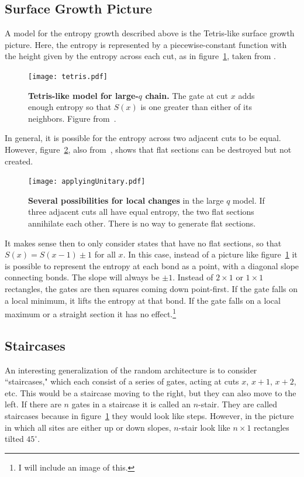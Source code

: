 \documentclass[11pt]{article}
\begin{document}
\subsection{Surface Growth Picture} \emph{} \label{sub:surfgrowth}

A model for the entropy growth described above is the Tetris-like surface growth picture. Here, the entropy is represented by a piecewise-constant function with the height given by the entropy across each cut, as in figure~\ref{fig:tetris}, taken from \cite{Nahum2017}. 
\begin{figure}
	\centering
	\texttt{[image: tetris.pdf]}
	\caption{\textbf{Tetris-like model for large-$q$ chain.} The gate at cut $x$ adds enough entropy so that $S(x)$ is one greater than either of its neighbors. Figure from~\cite{Nahum2017}.}
	\label{fig:tetris}
\end{figure}
In general, it is possible for the entropy across two adjacent cuts to be equal. However, figure~\ref{fig:applyingUnitary}, also from~\cite{Nahum2017}, shows that flat sections can be destroyed but not created. 
\begin{figure}
	\centering
	\texttt{[image: applyingUnitary.pdf]}
	\caption{\textbf{Several possibilities for local changes} in the large $q$ model. If three adjacent cuts all have equal entropy, the two flat sections annihilate each other. There is no way to generate flat sections.}
	\label{fig:applyingUnitary}
\end{figure}

It makes sense then to only consider states that have no flat sections, so that $S(x) = S(x-1)\pm1$ for all $x$. In this case, instead of a picture like figure~\ref{fig:tetris} it is possible to represent the entropy at each bond as a point, with a diagonal slope connecting bonds. The slope will always be $\pm1$. Instead of $2\times1$ or $1\times1$ rectangles, the gates are then squares coming down point-first. If the gate falls on a local minimum, it lifts the entropy at that bond. If the gate falls on a local maximum or a straight section it has no effect.\footnote{I will include an image of this.}

\subsection{Staircases}\emph{} \label{sub:stairs}

An interesting generalization of the random architecture is to consider ``staircases," which each consist of a series of gates, acting at cuts $x$, $x+1$, $x+2$, etc. This would be a staircase moving to the right, but they can also move to the left. If there are $n$ gates in a staircase it is called an $n$-stair. They are called staircases because in figure~\ref{fig:tetris} they would look like steps. However, in the picture in which all sites are either up or down slopes, $n$-stair look like $n\times 1$ rectangles tilted $45^\circ$.
\end{document}
